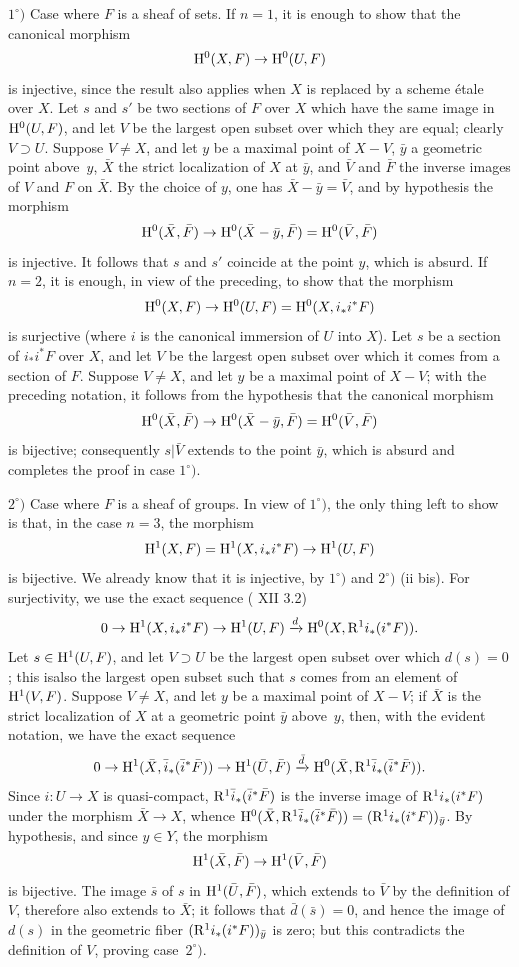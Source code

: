 $1^\circ)$ Case where $F$ is a sheaf of sets. If $n=1$, it is enough to show that the canonical morphism
$$
\mathrm H^0(X, F)\to \mathrm H^0(U, F)$$
is injective, since the result also applies when $X$ is replaced by a scheme étale over $X$. Let $s$ and $s'$ be two sections of $F$ over $X$ which have the same image in $\mathrm H^0(U, F)$, and let $V$ be the largest open subset over which they are equal; clearly $V\supset U$. Suppose $V\neq X$, and let $y$ be a maximal point of $X-V$, $\bar y$ a geometric point above\pageoriginale~$y$, $\bar X$ the strict localization of $X$ at $\bar y$, and $\bar V$ and $\bar F$ the inverse images of $V$ and $F$ on $\bar X$. By the choice of $y$, one has $\bar X-\bar y=\bar V$, and by hypothesis the morphism
$$
\mathrm H^0(\bar X, \bar F)\to \mathrm H^0(\bar X-\bar y, \bar F)=\mathrm H^0(\bar V, \bar F)$$
is injective. It follows that $s$ and $s'$ coincide at the point $y$, which is absurd. If $n=2$, it is enough, in view of the preceding, to show that the morphism
$$
\mathrm H^0(X, F)\to \mathrm H^0(U, F)=\mathrm H^0(X, i_*i^*F)$$
is surjective (where $i$ is the canonical immersion of $U$ into $X$). Let $s$ be a section of $i_*i^*F$ over $X$, and let $V$ be the largest open subset over which it comes from a section of $F$. Suppose $V\neq X$, and let $y$ be a maximal point of $X-V$; with the preceding notation, it follows from the hypothesis that the canonical morphism
$$
\mathrm H^0(\bar X, \bar F)\to \mathrm H^0(\bar X-\bar y, \bar F)=\mathrm H^0(\bar V, \bar F)
$$
is bijective; consequently $s|\bar V$ extends to the point $\bar y$, which is absurd and completes the proof in case $1^\circ)$.

$2^\circ)$ Case where $F$ is a sheaf of groups. In view of $1^\circ)$, the only thing left to show is that, in the case $n=3$, the morphism
$$
\mathrm H^1(X, F)=\mathrm H^1(X, i_*i^*F)\to \mathrm H^1(U, F)$$
is bijective. We already know that it is injective, by $1^\circ)$ and  $2^\circ)$ (ii bis). For surjectivity, we use the exact sequence ( XII 3.2)
$$
0\to \mathrm H^1(X, i_*i^*F)\to \mathrm H^1(U, F)\xrightarrow{d}\mathrm H^0(X, \mathrm R^1i_*(i^*F)).
$$
Let $s\in \mathrm H^1(U, F)$, and let $V\supset U$ be the largest open subset over which $d(s)=0$; this is\pageoriginale also the largest open subset such that $s$ comes from an element of $\mathrm H^1(V, F)$. Suppose $V\neq X$, and let $y$ be a maximal point of $X-V$; if $\bar X$ is the strict localization of $X$ at a geometric point $\bar y$ above~$y$, then, with the evident notation, we have the exact sequence
$$
0\to \mathrm H^1(\bar X, \bar i_*(\bar i^*\bar F))\to \mathrm H^1(\bar U, \bar F)\xrightarrow{\bar d}\mathrm H^0(\bar X, \mathrm R^1\bar i_*(\bar i^*\bar F)).
$$
Since $i:U\to X$ is quasi-compact, $\mathrm R^1\bar i_*(\bar i^*\bar F)$ is the inverse image of $\mathrm R^1i_*(i^*F)$ under the morphism $\bar X\to X$, whence $\mathrm H^0(\bar X, \mathrm R^1\bar i_*(\bar i^*\bar F))=(\mathrm R^1i_*(i^*F))_{\bar y}$. By hypothesis, and since $y\in Y$, the morphism
$$
\mathrm H^1(\bar X, \bar F)\to \mathrm H^1(\bar V, \bar F)
$$
is bijective. The image $\bar s$ of $s$ in $\mathrm H^1(\bar U, \bar F)$, which extends to $\bar V$ by the definition of $V$, therefore also extends to $\bar X$; it follows that $\bar d(\bar s)=0$, and hence the image of $d(s)$ in the geometric fiber $(\mathrm R^1i_*(i^*F))_{\bar y}$ is zero; but this contradicts the definition of $V$, proving case~$2^\circ)$.

